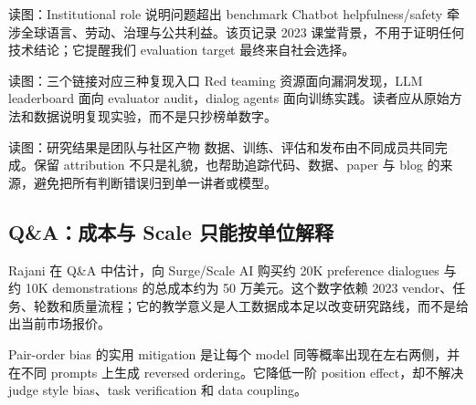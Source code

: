
\begin{knowledgebox}{读图：Institutional role 说明问题超出 benchmark}
Chatbot helpfulness/safety 牵涉全球语言、劳动、治理与公共利益。该页记录 2023 课堂背景，不用于证明任何技术结论；它提醒我们 evaluation target 最终来自社会选择。
\end{knowledgebox}


\begin{knowledgebox}{读图：三个链接对应三种复现入口}
Red teaming 资源面向漏洞发现，LLM leaderboard 面向 evaluator audit，dialog agents 面向训练实践。读者应从原始方法和数据说明复现实验，而不是只抄榜单数字。
\end{knowledgebox}


\begin{knowledgebox}{读图：研究结果是团队与社区产物}
数据、训练、评估和发布由不同成员共同完成。保留 attribution 不只是礼貌，也帮助追踪代码、数据、paper 与 blog 的来源，避免把所有判断错误归到单一讲者或模型。
\end{knowledgebox}

\subsection{Q\&A：成本与 Scale 只能按单位解释}

Rajani 在 Q\&A 中估计，向 Surge/Scale AI 购买约 20K preference dialogues 与约 10K demonstrations 的总成本约为 50 万美元。这个数字依赖 2023 vendor、任务、轮数和质量流程；它的教学意义是人工数据成本足以改变研究路线，而不是给出当前市场报价。


Pair-order bias 的实用 mitigation 是让每个 model 同等概率出现在左右两侧，并在不同 prompts 上生成 reversed ordering。它降低一阶 position effect，却不解决 judge style bias、task verification 和 data coupling。



